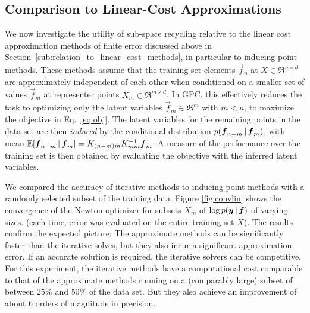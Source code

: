 \documentclass{article}
\begin{document}
\subsection{Comparison to Linear-Cost Approximations}%

We now investigate the utility of sub-space recycling relative to the linear cost approximation methods of finite error discussed above in Section~\ref{sub:relation_to_linear_cost_methods}, in particular to inducing point methods. These methods assume that the training set elements $\vec{f}_n$ at $X\in \Re^{n\times d}$ are approximately independent of each other when conditioned on a smaller set of values $\vec{f}_m$ at representer points $X_m\in \Re^{m\times d}$. In GPC, this effectively reduces the task to optimizing only the latent variables $\vec{f}_m\in \Re^{m}$ with $m<n$, to maximize the objective in Eq.~\eqref{eq:obj}. The latent variables for the remaining points in the data set are then \emph{induced} by the conditional distribution $p(\boldsymbol{f}_{n-m}\,|\,\boldsymbol{f}_m)$, with mean $\mathbb{E} [\boldsymbol{f}_{n-m}\,|\,\boldsymbol{f}_m]=K_{(n-m)m} K^{-1}_{mm}\boldsymbol{f}_m$. A measure of the performance over the training set is then obtained by evaluating the objective with the inferred latent variables.  

We compared the accuracy of iterative methods to inducing point methods with a randomly selected subset of the training data. Figure \ref{fig:convlin} shows the convergence of the Newton optimizer for subsets $X_m$ of $\log p(\boldsymbol{y}\,|\, \boldsymbol{f})$ of varying sizes. (each time, error was evaluated on the entire training set $X$). The results confirm the expected picture: The approximate methods can be significantly faster than the iterative solves, but they also incur a significant approximation error. If an accurate solution is required, the iterative solvers can be competitive. For this experiment, the iterative methods have a computational cost comparable to that of the approximate methods running on a (comparably large) subset of between $25\%$ and $50\%$ of the data set. But they also achieve an improvement of about 6 orders of magnitude in precision.
\end{document}
